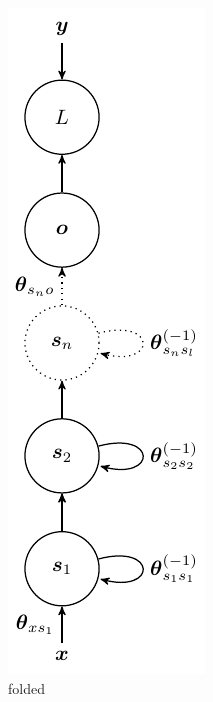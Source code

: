 \begin{figure}[H]
  \centering
  \begin{subfigure}[]{.2\textwidth}
    \begin{center}
    \includegraphics[]{figs/rnn.pdf}
    \end{center}
    \caption{folded}
    \label{fig:rnn_f}
  \end{subfigure}
  \begin{subfigure}[]{.79\textwidth}
    \begin{center}

\end{center}
\end{subfigure}
\end{figure}
